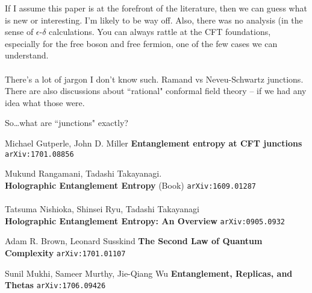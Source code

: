 \documentclass[12pt]{article}
\begin{document}
If I assume this paper is at the forefront of the literature, then we can guess what is new or interesting.  I'm likely to be way off.  Also, there was no analysis (in the sense of $\epsilon$-$\delta$ calculations.  You can always rattle at the CFT foundations, especially for the free boson and free fermion, one of the few cases we can understand. \\ \\
There's a lot of jargon I don't know such.  Ramand vs Neveu-Schwartz junctions. There are also discussions about ``rational" conformal field theory -- if we had any idea what those were. 

\newpage

\noindent So\dots what are ``junctions" exactly?

 
\vfill

\begin{thebibliography}{}

\item Michael Gutperle, John D. Miller \textbf{Entanglement entropy at CFT junctions} \texttt{arXiv:1701.08856}

\item Mukund Rangamani, Tadashi Takayanagi. \\ \textbf{Holographic Entanglement Entropy} (Book) \texttt{arXiv:1609.01287} \\ \\
Tatsuma Nishioka, Shinsei Ryu, Tadashi Takayanagi \\ \textbf{Holographic Entanglement Entropy: An Overview} \texttt{arXiv:0905.0932}

\item Adam R. Brown, Leonard Susskind \textbf{The Second Law of Quantum Complexity} \texttt{arXiv:1701.01107}

\item Sunil Mukhi, Sameer Murthy, Jie-Qiang Wu \textbf{Entanglement, Replicas, and Thetas} \texttt{arXiv:1706.09426}

\end{thebibliography}
\end{document}
